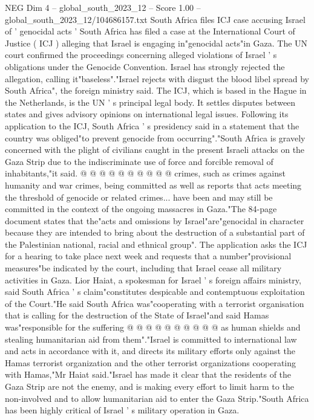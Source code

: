 \begin{textsample}{NEG Dim 4 – global\_south\_2023\_12 – Score 1.00 – global\_south\_2023\_12/104686157.txt}  \label{ex:f4_neg_324}
South Africa files ICJ case accusing Israel of ' genocidal acts ' South Africa has filed a case at the International Court of Justice ( ICJ ) alleging that Israel is engaging in"genocidal acts"in Gaza.
The UN court confirmed the proceedings concerning alleged violations of Israel ' s obligations under the Genocide Convention.
Israel has strongly rejected the allegation, calling it"baseless"."Israel rejects with disgust the blood libel spread by South Africa", the foreign ministry said.
The ICJ, which is based in the Hague in the Netherlands, is the UN ' s principal legal body.
It settles disputes between states and gives advisory opinions on international legal issues.
Following its application to the ICJ, South Africa ' s presidency said in a statement that the country was obliged"to prevent genocide from occurring"."South Africa is gravely concerned with the plight of civilians caught in the present Israeli attacks on the Gaza Strip due to the indiscriminate use of force and forcible removal of inhabitants,"it said. @ @ @ @ @ @ @ @ @ @ crimes, such as crimes against humanity and war crimes, being committed as well as reports that acts meeting the threshold of genocide or related crimes... have been and may still be committed in the context of the ongoing massacres in Gaza."The 84-page document states that the"acts and omissions by Israel"are"genocidal in character because they are intended to bring about the destruction of a substantial part of the Palestinian national, racial and ethnical group".
The application asks the ICJ for a hearing to take place next week and requests that a number"provisional measures"be indicated by the court, including that Israel cease all military activities in Gaza.
Lior Haiat, a spokesman for Israel ' s foreign affairs ministry, said South Africa ' s claim"constitutes despicable and contemptuous exploitation of the Court."He said South Africa was"cooperating with a terrorist organisation that is calling for the destruction of the State of Israel"and said Hamas was"responsible for the suffering @ @ @ @ @ @ @ @ @ @ as human shields and stealing humanitarian aid from them"."Israel is committed to international law and acts in accordance with it, and directs its military efforts only against the Hamas terrorist organization and the other terrorist organizations cooperating with Hamas,"Mr Haiat said."Israel has made it clear that the residents of the Gaza Strip are not the enemy, and is making every effort to limit harm to the non-involved and to allow humanitarian aid to enter the Gaza Strip."South Africa has been highly critical of Israel ' s military operation in Gaza.

\end{textsample}
